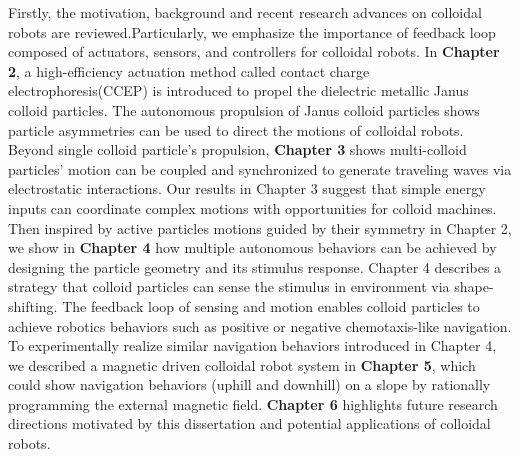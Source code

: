 \begin{titlepage}
Firstly, the motivation, background and recent research  advances on colloidal robots are reviewed.Particularly, we emphasize the importance of feedback
loop composed of actuators, sensors, and controllers for colloidal robots.  In \textbf{Chapter 2},  a high-efficiency actuation method called contact charge electrophoresis(CCEP) is introduced to propel the dielectric metallic Janus colloid particles.  The autonomous propulsion of Janus colloid particles shows particle asymmetries can be used to direct the motions of colloidal robots. Beyond single colloid particle's propulsion, \textbf{Chapter 3} shows multi-colloid particles' motion can be coupled and synchronized to generate  traveling waves via electrostatic interactions.   Our results in Chapter 3 suggest that simple energy inputs can coordinate complex motions with opportunities for colloid machines.  Then inspired by active particles motions guided by their symmetry in Chapter 2, we show in \textbf{Chapter 4} how multiple autonomous behaviors can be achieved by designing the particle geometry and its stimulus response. Chapter 4 describes a strategy that colloid particles can sense the stimulus in environment via shape-shifting. The feedback loop of sensing and motion enables colloid particles to achieve robotics behaviors such as positive or negative chemotaxis-like navigation. To experimentally realize similar navigation behaviors introduced in Chapter 4,  we described a magnetic driven colloidal robot system in \textbf{Chapter 5}, which could show navigation behaviors (uphill and downhill) on a slope by rationally  programming the external magnetic field. \textbf{Chapter 6} highlights future research  directions motivated by this dissertation and potential applications of colloidal robots.

\vspace*{\fill}
\end{titlepage}
